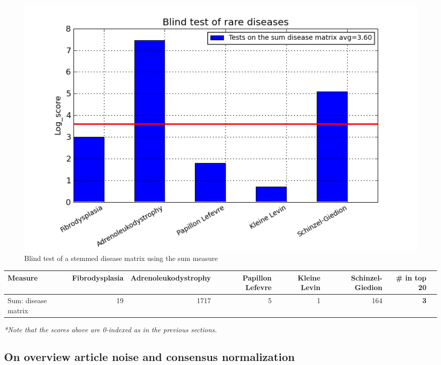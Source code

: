 \begin{figure}[H]
  \caption{Blind test of a stemmed disease matrix using the sum measure}
  \begin{center}
    \includegraphics[width=1\textwidth]{barcharts/blind_test.png}
  \end{center}
  \label{blind_test_barchart}
\end{figure}

\begin{table}[H]
\begin{tiny}
  \begin{tabular}{|l|r|r|r|r|r|r|r|}
    \hline
    Measure & Fibrodysplasia & Adrenoleukodystrophy & Papillon Lefevre & Kleine Levin & Schinzel-Giedion & \scriptsize{\textbf{\# in top 20}}\\
    \hline
    Sum: disease matrix & 19 & 1717 & 5 & 1 & 164 & \scriptsize{\textbf{3}} \\
    \hline
    \end{tabular}
\end{tiny}
\end{table}

\noindent \small{\textit{*Note that the scores above are 0-indexed as in the previous sections.}}

\subsection{On overview article noise and consensus normalization\label{Overview}}

